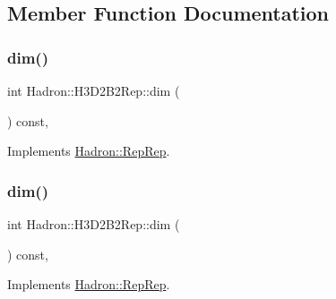 \subsection{Member Function Documentation}
\mbox{\label{structHadron_1_1H3D2B2Rep_ad687c1e4069297e07ac09c437c3b5483}} 
\subsubsection{\texorpdfstring{dim()}{dim()}\hspace{0.1cm}{\footnotesize\ttfamily [1/5]}}
{\footnotesize\ttfamily int Hadron\+::\+H3\+D2\+B2\+Rep\+::dim (\begin{DoxyParamCaption}{ }\end{DoxyParamCaption}) const\hspace{0.3cm}{\ttfamily [inline]}, {\ttfamily [virtual]}}



Implements \mbox{\hyperlink{structHadron_1_1RepRep_a92c8802e5ed7afd7da43ccfd5b7cd92b}{Hadron\+::\+Rep\+Rep}}.

\mbox{\label{structHadron_1_1H3D2B2Rep_ad687c1e4069297e07ac09c437c3b5483}} 
\subsubsection{\texorpdfstring{dim()}{dim()}\hspace{0.1cm}{\footnotesize\ttfamily [2/5]}}
{\footnotesize\ttfamily int Hadron\+::\+H3\+D2\+B2\+Rep\+::dim (\begin{DoxyParamCaption}{ }\end{DoxyParamCaption}) const\hspace{0.3cm}{\ttfamily [inline]}, {\ttfamily [virtual]}}



Implements \mbox{\hyperlink{structHadron_1_1RepRep_a92c8802e5ed7afd7da43ccfd5b7cd92b}{Hadron\+::\+Rep\+Rep}}.

\mbox{\label{structHadron_1_1H3D2B2Rep_ad687c1e4069297e07ac09c437c3b5483}} 
